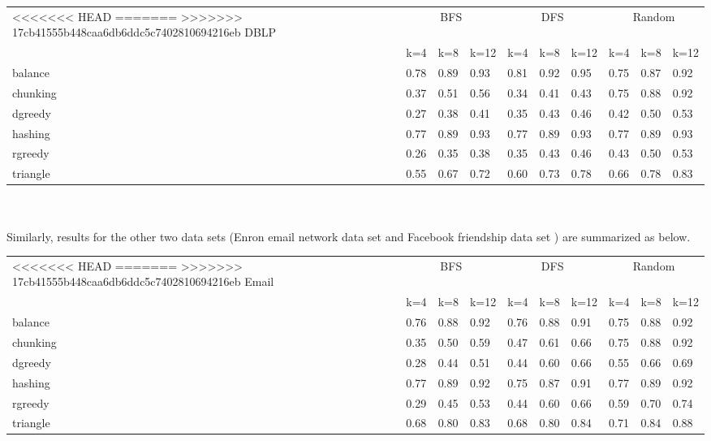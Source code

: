 \documentclass[12pt]{article}
\begin{document}
\begin{tabular}{llllllllll}
<<<<<<< HEAD
\toprule
=======
\toprule 
>>>>>>> 17cb41555b448caa6db6ddc5c7402810694216eb
    DBLP & \multicolumn{3}{c}{BFS} & \multicolumn{3}{c}{DFS} & \multicolumn{3}{c}{Random}\\

    & k=4 & k=8 & k=12
    & k=4 & k=8 & k=12
     & k=4 & k=8 & k=12  \\
    \midrule
    balance &    0.78 	& 0.89 	& 0.93 &	 0.81 &	 0.92 &	 0.95 &	 0.75 &	 0.87 &	 0.92   \\
chunking&	 0.37 &	 0.51 &	 0.56 &	 0.34 &	 0.41 &	 0.43 &	 0.75 &	 0.88 &	 0.92 \\
dgreedy&	 0.27 &	 0.38& 	 0.41 & 	 0.35 & 	 0.43 & 	 0.46 & 	 0.42 &  	 0.50 & 	 0.53 \\
hashing&	 0.77 &	 0.89 & 	 0.93 & 	 0.77 & 	 0.89 & 	 0.93 & 	 0.77 & 	 0.89 & 	 0.93 \\
rgreedy	& 0.26 &	 0.35 & 	 0.38 & 	 0.35 & 	 0.43 & 	 0.46 & 	 0.43 & 	 0.50 & 	 0.53 \\
triangle	 &0.55 &	 0.67 & 	 0.72 & 	 0.60 & 	 0.73 & 	 0.78 & 	 0.66 & 	 0.78 & 	 0.83 \\
    \bottomrule
\end{tabular}
\\
\\

Similarly, results for the other two data sets (Enron email network data set and Facebook friendship data set ) are summarized as below.\\

\begin{tabular}{llllllllll}
<<<<<<< HEAD
\toprule
=======
\toprule 
>>>>>>> 17cb41555b448caa6db6ddc5c7402810694216eb
    Email & \multicolumn{3}{c}{BFS} & \multicolumn{3}{c}{DFS} & \multicolumn{3}{c}{Random}\\

    & k=4 & k=8 & k=12
    & k=4 & k=8 & k=12
     & k=4 & k=8 & k=12  \\
    \midrule
    balance &  0.76 &	 0.88 &	 0.92 &	 0.76 &	 0.88 &	 0.91 &	 0.75 &	 0.88 &	 0.92 \\
chunking&	 0.35 &	 0.50 &	 0.59 &	 0.47 &	 0.61 &	 0.66 &	 0.75 &	 0.88 &	 0.92 \\
dgreedy&	 0.28 &	 0.44 &	 0.51 &	 0.44 &	 0.60 &	 0.66 &	 0.55 &	 0.66 &	 0.69 \\
hashing&	   0.77& 	 0.89 &	 0.92 &	 0.75 &	 0.87 &	 0.91 &	 0.77 &	 0.89 &	 0.92 \\
rgreedy&	   0.29& 	 0.45 &	 0.53 &	 0.44 &	 0.60 &	 0.66 &	 0.59 &	 0.70 &	 0.74 \\
triangle&	   0.68& 	 0.80 &	 0.83 &	 0.68 &	 0.80 &	 0.84 &	 0.71 &	 0.84 &	 0.88 \\
    \bottomrule
\end{tabular}
\end{document}
